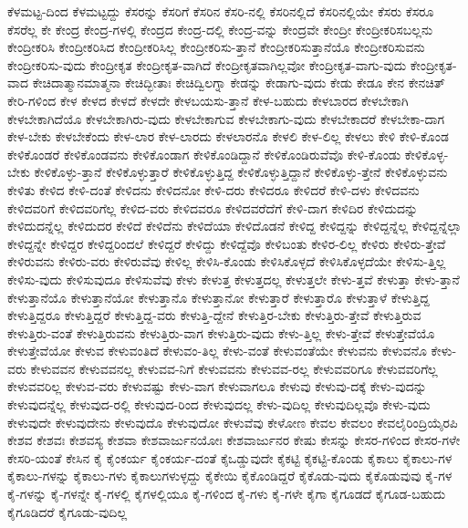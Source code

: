 {ಕೆಳಮಟ್ಟ-ದಿಂದ
ಕೆಳಮಟ್ಟದ್ದು
ಕೆಸರನ್ನು
ಕೆಸರಿಗೆ
ಕೆಸರಿನ
ಕೆಸರಿ-ನಲ್ಲಿ
ಕೆಸರಿನಲ್ಲಿದೆ
ಕೆಸರಿನಲ್ಲಿಯೇ
ಕೆಸರು
ಕೆಸರೂ
ಕೆಸರೆಲ್ಲ
ಕೇ
ಕೇಂದ್ರ
ಕೇಂದ್ರ-ಗಳಲ್ಲಿ
ಕೇಂದ್ರದ
ಕೇಂದ್ರ-ದಲ್ಲಿ
ಕೇಂದ್ರ-ವನ್ನು
ಕೇಂದ್ರವೇ
ಕೇಂದ್ರೀ
ಕೇಂದ್ರೀಕರಿಸಬಲ್ಲನು
ಕೇಂದ್ರೀಕರಿಸಿ
ಕೇಂದ್ರೀಕರಿಸಿದ
ಕೇಂದ್ರೀಕರಿಸಿಲ್ಲ
ಕೇಂದ್ರೀಕರಿಸು-ತ್ತಾನೆ
ಕೇಂದ್ರೀಕರಿಸುತ್ತಾನೆಯೊ
ಕೇಂದ್ರೀಕರಿಸುವನು
ಕೇಂದ್ರೀಕರಿಸು-ವುದು
ಕೇಂದ್ರೀಕೃತ
ಕೇಂದ್ರೀಕೃತ-ವಾಗಿದೆ
ಕೇಂದ್ರೀಕೃತವಾಗಿಲ್ಲವೋ
ಕೇಂದ್ರೀಕೃತ-ವಾಗು-ವುದು
ಕೇಂದ್ರೀಕೃತ-ವಾದ
ಕೇಚಿದಾತ್ಮಾನಮಾತ್ಮನಾ
ಕೇಚಿದ್ಭೀತಾಃ
ಕೇಚಿದ್ವಿಲಗ್ನಾ
ಕೇಡನ್ನು
ಕೇಡಾಗು-ವುದು
ಕೇಡು
ಕೇಡೂ
ಕೇನ
ಕೇನಚಿತ್
ಕೇರಿ-ಗಳಿಂದ
ಕೇಳ
ಕೇಳದ
ಕೇಳದೆ
ಕೇಳದೇ
ಕೇಳಬಯಸು-ತ್ತಾನೆ
ಕೇಳ-ಬಹುದು
ಕೇಳಬಾರದ
ಕೇಳಬೇಕಾಗಿ
ಕೇಳಬೇಕಾಗಿದೆಯೊ
ಕೇಳಬೇಕಾಗಿರು-ವುದು
ಕೇಳಬೇಕಾಗುವ
ಕೇಳಬೇಕಾಗು-ವುದು
ಕೇಳಬೇಕಾದರೆ
ಕೇಳಬೇಕಾ-ದಾಗ
ಕೇಳ-ಬೇಕು
ಕೇಳಬೇಕೆಂದು
ಕೇಳ-ಲಾರ
ಕೇಳ-ಲಾರದು
ಕೇಳಲಾರನೊ
ಕೇಳಲಿ
ಕೇಳ-ಲಿಲ್ಲ
ಕೇಳಲು
ಕೇಳಿ
ಕೇಳಿ-ಕೊಂಡ
ಕೇಳಿಕೊಂಡರೆ
ಕೇಳಿಕೊಂಡವನು
ಕೇಳಿಕೊಂಡಾಗ
ಕೇಳಿಕೊಂಡಿದ್ದಾನೆ
ಕೇಳಿಕೊಂಡಿರುವೆವೊ
ಕೇಳಿ-ಕೊಂಡು
ಕೇಳಿಕೊಳ್ಳ-ಬೇಕು
ಕೇಳಿಕೊಳ್ಳು-ತ್ತಾನೆ
ಕೇಳಿಕೊಳ್ಳುತ್ತಾರೆ
ಕೇಳಿಕೊಳ್ಳುತ್ತಿದ್ದ
ಕೇಳಿಕೊಳ್ಳುತ್ತಿದ್ದಾನೆ
ಕೇಳಿಕೊಳ್ಳು-ತ್ತೇನೆ
ಕೇಳಿಕೊಳ್ಳುವನು
ಕೇಳಿತು
ಕೇಳಿದ
ಕೇಳಿ-ದಂತೆ
ಕೇಳಿದನು
ಕೇಳಿದನೋ
ಕೇಳಿ-ದರು
ಕೇಳಿದರೂ
ಕೇಳಿದರೆ
ಕೇಳಿ-ದಳು
ಕೇಳಿದವನು
ಕೇಳಿದವರಿಗೆ
ಕೇಳಿದವರಿಗೆಲ್ಲ
ಕೇಳಿದ-ವರು
ಕೇಳಿದವರೂ
ಕೇಳಿದವರೆದೆಗೆ
ಕೇಳಿ-ದಾಗ
ಕೇಳಿದಿರ
ಕೇಳಿದುದನ್ನು
ಕೇಳಿದುದನ್ನೆಲ್ಲ
ಕೇಳಿದುದರ
ಕೇಳಿದೆ
ಕೇಳಿದೆನು
ಕೇಳಿದೆಯಾ
ಕೇಳಿದೊಡನೆ
ಕೇಳಿದ್ದ
ಕೇಳಿದ್ದನ್ನು
ಕೇಳಿದ್ದನ್ನೆಲ್ಲ
ಕೇಳಿದ್ದನ್ನೆಲ್ಲಾ
ಕೇಳಿದ್ದನ್ನೇ
ಕೇಳಿದ್ದರ
ಕೇಳಿದ್ದರಿಂದಲೆ
ಕೇಳಿದ್ದರೆ
ಕೇಳಿದ್ದು
ಕೇಳಿದ್ದೆವೊ
ಕೇಳಿಬಂತು
ಕೇಳಿರ-ಲಿಲ್ಲ
ಕೇಳಿರು
ಕೇಳಿರು-ತ್ತೇವೆ
ಕೇಳಿರುವನು
ಕೇಳಿರು-ವರು
ಕೇಳಿರುವೆವು
ಕೇಳಿಲ್ಲ
ಕೇಳಿಸಿ-ಕೊಂಡು
ಕೇಳಿಸಿಕೊಳ್ಳದೆ
ಕೇಳಿಸಿಕೊಳ್ಳದೆಯೇ
ಕೇಳಿಸು-ತ್ತಿಲ್ಲ
ಕೇಳಿಸು-ವುದು
ಕೇಳಿಸುವುದೂ
ಕೇಳಿಸುವೆವು
ಕೇಳು
ಕೇಳುತ್ತ
ಕೇಳುತ್ತದಲ್ಲ
ಕೇಳುತ್ತಲೇ
ಕೇಳು-ತ್ತವೆ
ಕೇಳುತ್ತಾ
ಕೇಳು-ತ್ತಾನೆ
ಕೇಳುತ್ತಾನೆಯೊ
ಕೇಳುತ್ತಾನೆಯೋ
ಕೇಳುತ್ತಾನೊ
ಕೇಳುತ್ತಾನೋ
ಕೇಳುತ್ತಾರೆ
ಕೇಳುತ್ತಾರೊ
ಕೇಳುತ್ತಾಳೆ
ಕೇಳುತ್ತಿದ್ದ
ಕೇಳುತ್ತಿದ್ದರೂ
ಕೇಳುತ್ತಿದ್ದರೆ
ಕೇಳುತ್ತಿದ್ದ-ವರು
ಕೇಳುತ್ತಿ-ದ್ದೇನೆ
ಕೇಳುತ್ತಿರ-ಬೇಕು
ಕೇಳುತ್ತಿರು-ತ್ತೇವೆ
ಕೇಳುತ್ತಿರುವ
ಕೇಳುತ್ತಿರು-ವಂತೆ
ಕೇಳುತ್ತಿರುವನು
ಕೇಳುತ್ತಿರು-ವಾಗ
ಕೇಳುತ್ತಿರು-ವುದು
ಕೇಳು-ತ್ತಿಲ್ಲ
ಕೇಳು-ತ್ತೇವೆ
ಕೇಳುತ್ತೇವೆಯೊ
ಕೇಳುತ್ತೇವೆಯೋ
ಕೇಳುವ
ಕೇಳುವಂತಿದೆ
ಕೇಳುವಂ-ತಿಲ್ಲ
ಕೇಳು-ವಂತೆ
ಕೇಳುವಂತೆಯೇ
ಕೇಳುವನು
ಕೇಳುವನೊ
ಕೇಳು-ವರು
ಕೇಳುವವನ
ಕೇಳುವವನಲ್ಲ
ಕೇಳುವವ-ನಿಗೆ
ಕೇಳುವವನು
ಕೇಳುವವ-ರಲ್ಲ
ಕೇಳುವವರಿಗೂ
ಕೇಳುವವರಿಗೆಲ್ಲ
ಕೇಳುವವರಿಲ್ಲ
ಕೇಳುವ-ವರು
ಕೇಳುವಷ್ಟು
ಕೇಳು-ವಾಗ
ಕೇಳುವಾಗಲೂ
ಕೇಳುವು
ಕೇಳುವು-ದಕ್ಕೆ
ಕೇಳು-ವುದನ್ನು
ಕೇಳುವುದನ್ನೆಲ್ಲ
ಕೇಳುವುದ-ರಲ್ಲಿ
ಕೇಳುವುದ-ರಿಂದ
ಕೇಳುವುದಲ್ಲ
ಕೇಳು-ವುದಿಲ್ಲ
ಕೇಳುವುದಿಲ್ಲವೊ
ಕೇಳು-ವುದು
ಕೇಳುವುದೇ
ಕೇಳುವುದೇನು
ಕೇಳುವುದೊ
ಕೇಳುವುದೋ
ಕೇಳುವೆವು
ಕೇಳೋಣ
ಕೇವಲ
ಕೇವಲಂ
ಕೇವಲೈರಿಂದ್ರಿಯೈರಪಿ
ಕೇಶವ
ಕೇಶವಃ
ಕೇಶವಸ್ಯ
ಕೇಶವಾ
ಕೇಶವಾರ್ಜುನಯೋಃ
ಕೇಶವಾರ್ಜುನರ
ಕೇಷು
ಕೇಸನ್ನು
ಕೇಸರ-ಗಳಿಂದ
ಕೇಸರ-ಗಳೇ
ಕೇಸರಿ-ಯಂತೆ
ಕೇಸಿನ
ಕೈ
ಕೈಂಕರ್ಯ
ಕೈಂಕರ್ಯ-ದಂತೆ
ಕೈಒಡ್ಡುವುದೇ
ಕೈಕಟ್ಟಿ
ಕೈಕಟ್ಟಿ-ಕೊಂಡು
ಕೈಕಾಲು
ಕೈಕಾಲು-ಗಳ
ಕೈಕಾಲು-ಗಳನ್ನು
ಕೈಕಾಲು-ಗಳು
ಕೈಕಾಲುಗಳುಳ್ಳದ್ದು
ಕೈಕೇಯಿ
ಕೈಕೊಂಡಿದ್ದರೆ
ಕೈಕೊಡು-ವುದು
ಕೈಕೊಡುವುವು
ಕೈ-ಗಳ
ಕೈ-ಗಳನ್ನು
ಕೈ-ಗಳನ್ನೇ
ಕೈ-ಗಳಲ್ಲಿ
ಕೈಗಳಲ್ಲಿಯೂ
ಕೈ-ಗಳಿಂದ
ಕೈ-ಗಳು
ಕೈ-ಗಳೇ
ಕೈಗಾ
ಕೈಗೂಡದೆ
ಕೈಗೂಡ-ಬಹುದು
ಕೈಗೂಡಿದರೆ
ಕೈಗೂಡು-ವುದಿಲ್ಲ
}
